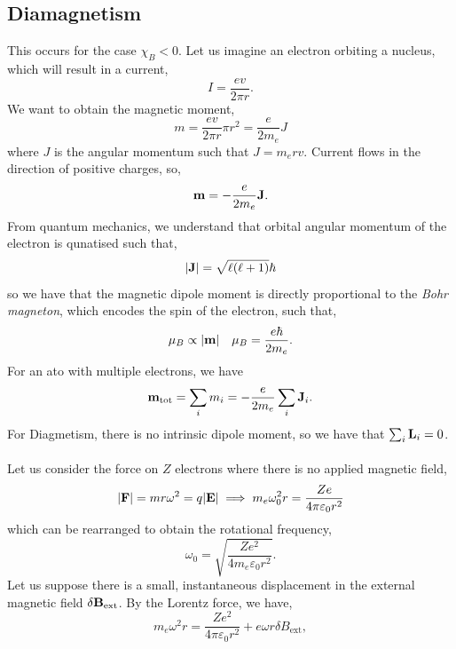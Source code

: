 \documentclass{book}
\begin{document}
\subsection{Diamagnetism}
This occurs for the case $\chi_B < 0$. Let us imagine an electron orbiting a nucleus, which will result in a current,
\begin{equation}
	I = \frac{ev}{2\pi r}.
\end{equation}
We want to obtain the magnetic moment,
\begin{equation}
	m = \frac{ev}{2\pi r}\pi r^2 = \frac{e}{2m_e}J
\end{equation}
where $J$ is the angular momentum such that $J = m_erv$. Current flows in the direction of positive charges, so,
\begin{equation}
	\vb{m} = - \frac{e}{2m_e}\vb{J}.
\end{equation}
From quantum mechanics, we understand that orbital angular momentum of the electron is qunatised such that,
\begin{equation}
	\left|\vb{J}\right| = \sqrt{\ell(\ell + 1)}\hbar
\end{equation}
so we have that the magnetic dipole moment is directly proportional to the \textit{Bohr magneton}, which encodes the spin of the electron, such that,
\begin{align}
	\mu_B \propto |\vb{m}| && \mu_B = \frac{e\hbar}{2m_e}.
\end{align}
For an ato with multiple electrons, we have 
\begin{equation}
	\vb{m}_{\text{tot}} = \sum_i m_i = -\frac{e}{2m_e}\sum_i\vb{J}_i.
\end{equation}
For Diagmetism, there is no intrinsic dipole moment, so we have that $\sum_i \vb{L}_i = 0$.
\\\\
Let us consider the force on $Z$ electrons where there is no applied magnetic field, 
\begin{equation}
	|\vb{F}| = mr\omega^2 = q|\vb{E}| \implies m_e \omega_0^2 r = \frac{Ze}{4\pi\varepsilon_0 r^2}
\end{equation} 
which can be rearranged to obtain the rotational frequency,
\begin{equation}
	\omega_0 = \sqrt{\frac{Ze^2}{4m_e\varepsilon_0 r^2}}.
\end{equation}
Let us suppose there is a small, instantaneous displacement in the external magnetic field $\delta \vb{B}_{\text{ext}}$. By the Lorentz force, we have,
\begin{equation}
	m_e \omega^2 r = \frac{Ze^2}{4\pi \varepsilon_0 r^2} + e\omega r \delta B_{\text{ext}},
\end{equation}
\end{document}
